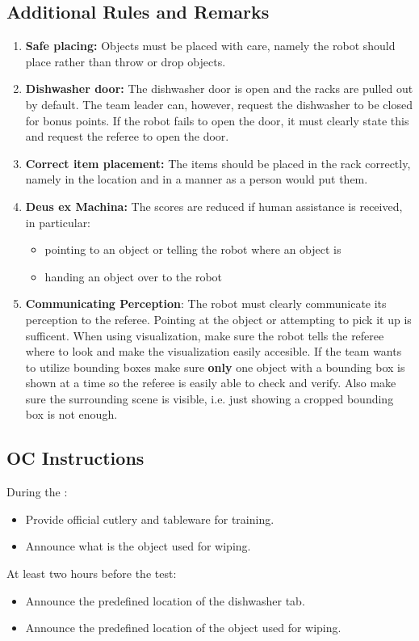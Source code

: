 \subsection*{Additional Rules and Remarks}
\begin{enumerate}[nosep]
	\item \textbf{Safe placing:} Objects must be placed with care, namely the robot should place rather than throw or drop objects.
	\item \textbf{Dishwasher door:} The dishwasher door is open and the racks are pulled out by default.
	The team leader can, however, request the dishwasher to be closed for bonus points. If the robot fails to open the door, it must clearly state this and request the referee to open the door.
	\item \textbf{Correct item placement:} The items should be placed in the rack correctly, namely in the location and in a manner as a person would put them.
	\item \textbf{Deus ex Machina:} The scores are reduced if human assistance is received, in particular:
	\begin{itemize}[nosep]
		\item pointing to an object or telling the robot where an object is
		\item handing an object over to the robot
	\end{itemize}
	\item \textbf{Communicating Perception}: The robot must clearly communicate its perception to the referee.
	Pointing at the object or attempting to pick it up is sufficent. 
	When using visualization, make sure the robot tells the referee where to look and make the visualization easily accesible. 
	If the team wants to utilize bounding boxes make sure \textbf{only} one object with a bounding box is shown at a time so the referee is easily able to check and verify. 
	Also make sure the surrounding scene is visible, i.e. just showing a cropped bounding box is not enough.
\end{enumerate}

\subsection*{OC Instructions}

During the \SetupDays{}:
\begin{itemize}
	\item Provide official cutlery and tableware for training.
	\item Announce what is the object used for wiping.
\end{itemize}
At least two hours before the test:
\begin{itemize}
	\item Announce the predefined location of the dishwasher tab.
	\item Announce the predefined location of the object used for wiping.
\end{itemize}


